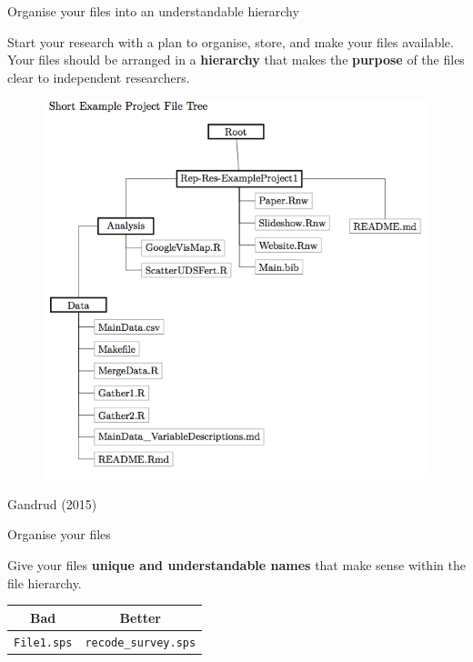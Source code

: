\documentclass[10pt]{beamer}
\begin{document}
\begin{frame}{Organise your files into an understandable hierarchy}

    Start your research with a plan to organise, store, and make your files available. Your files should be arranged in a \textbf{hierarchy} that makes the \textbf{purpose} of the files clear to independent researchers.

    \begin{figure}
        \includegraphics[scale=0.27]{img/file_tree.png}
    \end{figure}

{\tiny{Gandrud (2015)}}

\end{frame}

\begin{frame}{Organise your files}

    Give your files \textbf{unique and understandable names} that make sense within the file hierarchy.

    \begin{table}
        \begin{tabular}{c c}
        \hline
        Bad & Better \\
        \hline\hline
        \texttt{File1.sps} & \texttt{recode\_survey.sps} \\
        \hline
        \end{tabular}
    \end{table}

\end{frame}
\end{document}
